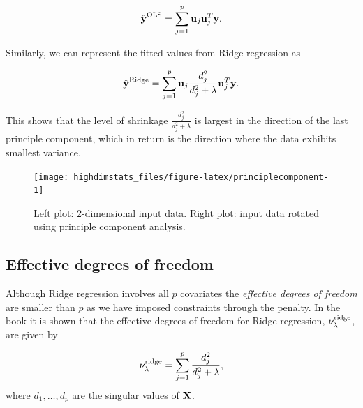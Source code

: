 \documentclass[
]{book}
\newenvironment{Shaded}{\begin{snugshade}}{\end{snugshade}}
\newcommand{\CommentTok}[1]{\textcolor[rgb]{0.56,0.35,0.01}{\textit{#1}}}
\newcommand{\DecValTok}[1]{\textcolor[rgb]{0.00,0.00,0.81}{#1}}
\newcommand{\FunctionTok}[1]{\textcolor[rgb]{0.00,0.00,0.00}{#1}}
\newcommand{\NormalTok}[1]{#1}
\newcommand{\OtherTok}[1]{\textcolor[rgb]{0.56,0.35,0.01}{#1}}
\newcommand{\SpecialCharTok}[1]{\textcolor[rgb]{0.00,0.00,0.00}{#1}}
\begin{document}
\[\hat{\textbf{y}}^{\rm OLS}=\sum_{j=1}^{p}\textbf{u}_j \textbf{u}_j^T \textbf{y}.\]

Similarly, we can represent the fitted values from Ridge regression as

\[\hat{\textbf{y}}^{\rm Ridge}=\sum_{j=1}^{p}\textbf{u}_j \frac{d_j^2}{d_j^2+\lambda}\textbf{u}_j^T\textbf{y}.\]

This shows that the level of shrinkage \(\frac{d_j^2}{d_j^2+\lambda}\) is largest in the direction of the last principle component, which in return is the direction where the data exhibits smallest variance.

\begin{figure}

{\centering \texttt{[image: highdimstats\_files/figure-latex/principlecomponent-1]} 

}

\caption{Left plot: 2-dimensional input data. Right plot: input data rotated using principle component analysis.}\label{fig:principlecomponent}
\end{figure}

\hypertarget{effective-degrees-of-freedom}{%
\subsection{Effective degrees of freedom}\label{effective-degrees-of-freedom}}

Although Ridge regression involves all \(p\) covariates the \emph{effective degrees of freedom} are smaller than \(p\) as we have imposed constraints through the penalty. In the book \citet{elements} it is shown that the effective degrees of freedom for Ridge regression, \(\nu^{\rm ridge}_{\lambda}\), are given by

\[\nu^{\rm ridge}_{\lambda}=\sum_{j=1}^{p}\frac{d_j^2}{d_j^2+\lambda},\]
where \(d_1,\ldots,d_p\) are the singular values of \(\bf X\).

\begin{Shaded}
\end{Shaded}
\end{document}
